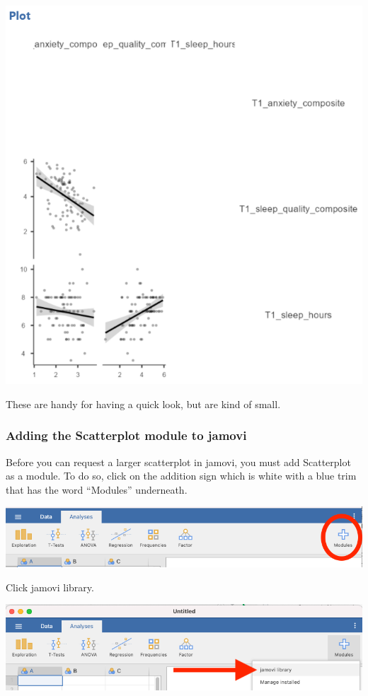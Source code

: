 \documentclass[
]{book}
\begin{document}
\includegraphics{img/CorrelationMatrixPlot.png}

These are handy for having a quick look, but are kind of small.

\hypertarget{adding-the-scatterplot-module-to-jamovi}{%
\subsubsection{Adding the Scatterplot module to jamovi}\label{adding-the-scatterplot-module-to-jamovi}}

Before you can request a larger scatterplot in jamovi, you must add Scatterplot as a module. To do so, click on the addition sign which is white with a blue trim that has the word ``Modules'' underneath.

\includegraphics{img/modulesplus.png}

Click {jamovi library}.

\includegraphics{img/jamovilibrary.png}
\end{document}
